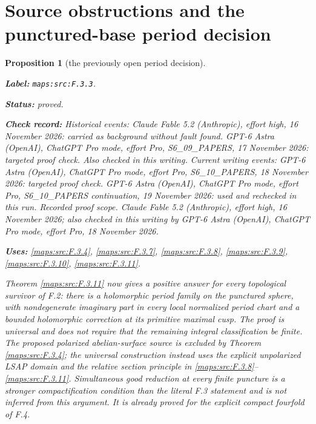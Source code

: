 \documentclass[11pt,a4paper]{article}
\newtheorem{proposition}[proposition]{Proposition}
\theoremstyle{definition}
\newcommand{\StatementRecord}[4]{\par\smallskip\begingroup\upshape\raggedright\noindent\textbf{Label:} \nolinkurl{#1}.\par\noindent\textbf{Status:} #2.\par\noindent\textbf{Check record:} #3.\par\noindent\textbf{Uses:} #4.\par\endgroup\smallskip}
\begin{document}
\section{Source obstructions and the punctured-base period decision}



\begin{proposition}[the previously open period decision]\label{maps:src:F.3.3}
\StatementRecord{maps:src:F.3.3}{proved}{Historical events: Claude Fable 5.2 (Anthropic), effort high, 16 November 2026: carried as background without fault found. GPT-6 Astra (OpenAI), ChatGPT Pro mode, effort Pro, S6\_09\_PAPERS, 17 November 2026: targeted proof check. Also checked in this writing. Current writing events: GPT-6 Astra (OpenAI), ChatGPT Pro mode, effort Pro, S6\_10\_PAPERS, 18 November 2026: targeted proof check. GPT-6 Astra (OpenAI), ChatGPT Pro mode, effort Pro, S6\_10\_PAPERS continuation, 19 November 2026: used and rechecked in this run. \emph{Recorded proof scope.} Claude Fable 5.2 (Anthropic), effort high, 16 November 2026; also checked in this writing by GPT-6 Astra (OpenAI), ChatGPT Pro mode, effort Pro, 18 November 2026}{\cref{maps:src:F.3.4}, \cref{maps:src:F.3.7}, \cref{maps:src:F.3.8}, \cref{maps:src:F.3.9}, \cref{maps:src:F.3.10}, \cref{maps:src:F.3.11}}


Theorem \ref{maps:src:F.3.11} now gives a positive answer for every topological
survivor of F.2: there is a holomorphic period family on the
punctured sphere, with nondegenerate imaginary part in every
local normalized period chart and a bounded holomorphic
correction at its primitive maximal cusp.  The proof is universal
and does not require that the remaining integral classification
be finite.  The proposed polarized abelian-surface source is
excluded by Theorem \ref{maps:src:F.3.4}; the universal construction instead
uses the explicit unpolarized LSAP domain and the relative
section principle in \ref{maps:src:F.3.8}--\ref{maps:src:F.3.11}.  Simultaneous good reduction
at every finite puncture is a stronger compactification condition
than the literal F.3 statement and is not inferred from this
argument.  It is already proved for the explicit compact
fourfold of F.4.

\end{proposition}
\end{document}
